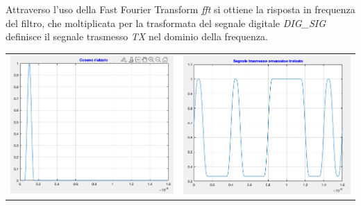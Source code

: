 \documentclass[12pt, a4paper]{article}
\begin{document}
Attraverso l'uso della Fast Fourier Transform \textit{fft} si ottiene la risposta in frequenza del filtro, che moltiplicata per la trasformata del segnale digitale \textit{DIG\_SIG} definisce il segnale trasmesso \textit{TX} nel dominio della frequenza.

\vspace{5mm}
\begin{center}
\begin{tabular}{c c}
\includegraphics[scale = 0.7]{cosrialzatoimg.png}
&
\includegraphics[scale = 0.7]{segnalesmussato.png}
\end{tabular}
\end{center}
\end{document}
